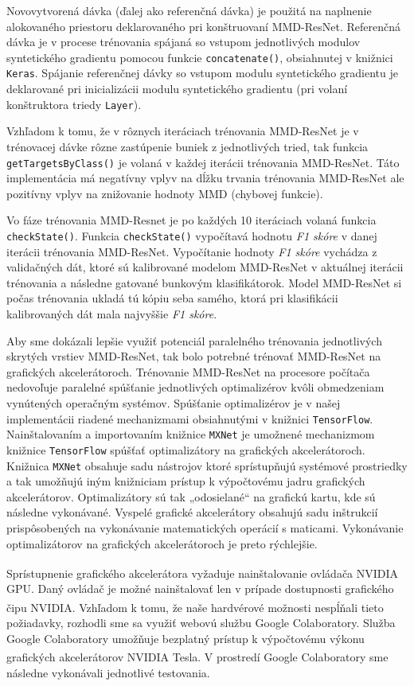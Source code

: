 Novovytvorená dávka (ďalej ako referenčná dávka) je použitá na naplnenie alokovaného priestoru deklarovaného pri konštruovaní MMD-ResNet. Referenčná dávka je v procese trénovania spájaná so vstupom jednotlivých modulov syntetického gradientu pomocou funkcie \texttt{concatenate()}, obsiahnutej v knižnici \texttt{Keras}. Spájanie referenčnej dávky so vstupom modulu syntetického gradientu je deklarované pri inicializácii modulu syntetického gradientu (pri volaní konštruktora triedy \texttt{Layer}). 

Vzhľadom k tomu, že v rôznych iteráciach trénovania MMD-ResNet je v trénovacej dávke rôzne zastúpenie buniek z jednotlivých tried, tak funkcia \texttt{getTargetsByClass()} je volaná v každej iterácii trénovania MMD-ResNet. Táto implementácia má negatívny vplyv na dĺžku trvania trénovania MMD-ResNet ale pozitívny vplyv na znižovanie hodnoty MMD (chybovej funkcie).

Vo fáze trénovania MMD-Resnet je po každých 10 iteráciach volaná funkcia \texttt{checkState()}. Funkcia \texttt{checkState()} vypočítavá hodnotu \textit{F1 skóre} v danej iterácii trénovania MMD-ResNet. Vypočítanie hodnoty \textit{F1 skóre} vychádza z validačných dát, ktoré sú kalibrované modelom MMD-ResNet v aktuálnej iterácii trénovania a následne gatované bunkovým klasifikátorok. Model MMD-ResNet si počas trénovania ukladá tú kópiu seba samého, ktorá pri klasifikácii kalibrovaných dát mala najvyššie \textit{F1 skóre}.

Aby sme dokázali lepšie využiť potenciál paralelného trénovania jednotlivých skrytých vrstiev MMD-ResNet, tak bolo potrebné trénovať MMD-ResNet na grafických akcelerátoroch. Trénovanie MMD-ResNet na procesore počítača nedovoľuje paralelné spúšťanie jednotlivých optimalizérov kvôli obmedzeniam vynútených operačným systémov. Spúšťanie optimalizérov je v našej implementácii riadené mechanizmami obsiahnutými v knižnici \texttt{TensorFlow}. Nainštalovaním a importovaním knižnice \texttt{MXNet} je umožnené mechanizmom knižnice \texttt{TensorFlow} spúšťať optimalizátory na grafických akcelerátoroch. Knižnica \texttt{MXNet} obsahuje sadu nástrojov ktoré sprístupňujú systémové prostriedky a tak umožňujú iným knižniciam prístup k výpočtovému jadru grafických akcelerátorov. Optimalizátory sú tak „odosielané“ na grafickú kartu, kde sú následne vykonávané. Vyspelé grafické akcelerátory obsahujú sadu inštrukcií prispôsobených na vykonávanie matematických operácií s maticami. Vykonávanie optimalizátorov na grafických akcelerátoroch je preto rýchlejšie.

Sprístupnenie grafického akcelerátora vyžaduje nainštalovanie ovládača NVIDIA\textsuperscript{\textregistered} GPU. Daný ovládač je možné nainštalovať len v prípade dostupnosti grafického čipu NVIDIA\textsuperscript{\textregistered}. Vzhľadom k tomu, že naše hardvérové možnosti nespĺňali tieto požiadavky, rozhodli sme sa využiť webovú službu Google Colaboratory. Služba Google Colaboratory umožňuje bezplatný prístup k výpočtovému výkonu grafických akcelerátorov NVIDIA\textsuperscript{\textregistered} Tesla. V prostredí Google Colaboratory sme následne vykonávali jednotlivé testovania.